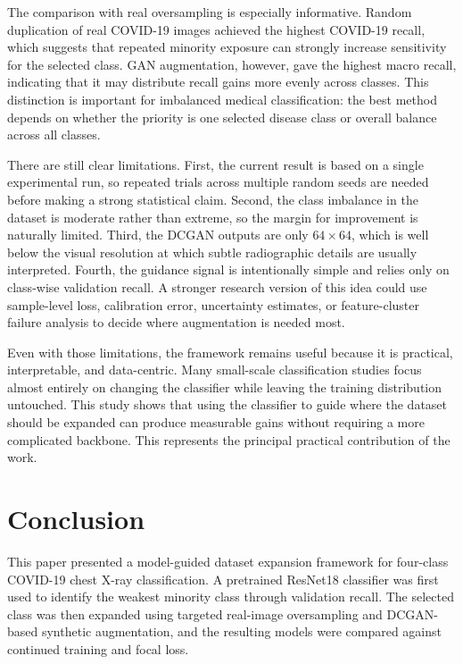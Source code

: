 \documentclass[conference]{IEEEtran}
\begin{document}
The comparison with real oversampling is especially informative. Random duplication of real COVID-19 images achieved the highest COVID-19 recall, which suggests that repeated minority exposure can strongly increase sensitivity for the selected class. GAN augmentation, however, gave the highest macro recall, indicating that it may distribute recall gains more evenly across classes. This distinction is important for imbalanced medical classification: the best method depends on whether the priority is one selected disease class or overall balance across all classes.

There are still clear limitations. First, the current result is based on a single experimental run, so repeated trials across multiple random seeds are needed before making a strong statistical claim. Second, the class imbalance in the dataset is moderate rather than extreme, so the margin for improvement is naturally limited. Third, the DCGAN outputs are only $64\times64$, which is well below the visual resolution at which subtle radiographic details are usually interpreted. Fourth, the guidance signal is intentionally simple and relies only on class-wise validation recall. A stronger research version of this idea could use sample-level loss, calibration error, uncertainty estimates, or feature-cluster failure analysis to decide where augmentation is needed most.

Even with those limitations, the framework remains useful because it is practical, interpretable, and data-centric. Many small-scale classification studies focus almost entirely on changing the classifier while leaving the training distribution untouched. This study shows that using the classifier to guide where the dataset should be expanded can produce measurable gains without requiring a more complicated backbone. This represents the principal practical contribution of the work.

\section{Conclusion}
This paper presented a model-guided dataset expansion framework for four-class COVID-19 chest X-ray classification. A pretrained ResNet18 classifier was first used to identify the weakest minority class through validation recall. The selected class was then expanded using targeted real-image oversampling and DCGAN-based synthetic augmentation, and the resulting models were compared against continued training and focal loss.
\end{document}
